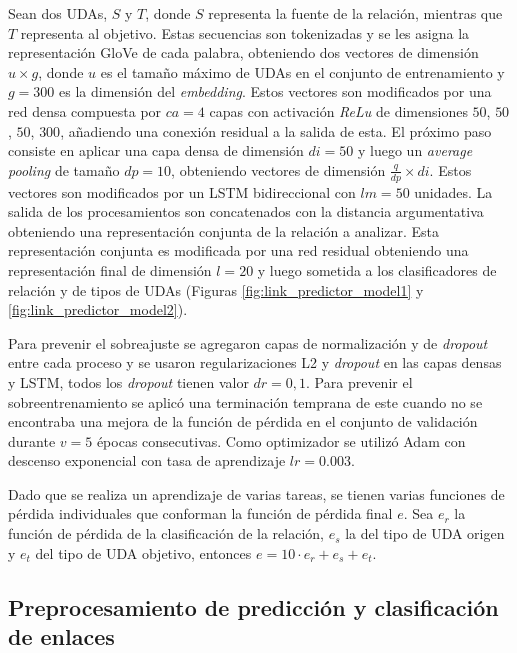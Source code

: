 \documentclass[a4paper,11pt,twocolumn,twoside]{article}
\begin{document}
Sean dos UDAs, $S$ y $T$, donde $S$ representa la fuente de la relación, mientras que $T$ representa
al objetivo. Estas secuencias son tokenizadas y se les asigna la representación GloVe de cada palabra, obteniendo
dos vectores de dimensión $u \times g$, donde $u$ es el tamaño máximo de UDAs en el conjunto de entrenamiento
y $g=300$ es la dimensión del \textit{embedding}.
Estos vectores son modificados por una red densa compuesta por $ca = 4$ capas con activación \textit{ReLu}
de dimensiones $50$, $50$, $50$, $300$, añadiendo una conexión residual a la salida de esta. 
El próximo paso consiste en aplicar una capa densa de dimensión $di=50$ y luego un \textit{average pooling}
de tamaño $dp=10$, obteniendo vectores de dimensión $\frac{q}{dp} \times di$. 
Estos vectores son modificados por un LSTM bidireccional con $lm=50$ unidades. 
La salida de los procesamientos son concatenados con la distancia argumentativa obteniendo una representación 
conjunta de la relación a analizar. Esta representación conjunta es modificada por una red residual obteniendo
una representación final de dimensión $l=20$ y luego sometida a los clasificadores de relación y de tipos de UDAs
(Figuras \ref{fig:link_predictor_model1} y \ref{fig:link_predictor_model2}).

Para prevenir el sobreajuste se agregaron capas de normalización y de \textit{dropout} entre cada 
proceso y se usaron regularizaciones L2 y \textit{dropout} en las capas densas y LSTM, 
todos los \textit{dropout} tienen valor $dr=0,1$. Para prevenir el sobreentrenamiento se aplicó una 
terminación temprana de este cuando no se encontraba una mejora de la función de pérdida en el 
conjunto de validación durante $v=5$ épocas consecutivas. Como optimizador se utilizó Adam con descenso 
exponencial con tasa de aprendizaje $lr=0.003$.

Dado que se realiza un aprendizaje de varias tareas, se tienen varias funciones de pérdida individuales que conforman 
la función de pérdida final $e$. Sea $e_r$ la función de pérdida de la clasificación de la relación, $e_s$ la del tipo de UDA origen  
y $e_t$ del tipo de UDA objetivo, entonces $e = 10 \cdot e_r + e_s + e_t$.

\subsection{Preprocesamiento de predicción y clasificación de enlaces}
\end{document}
